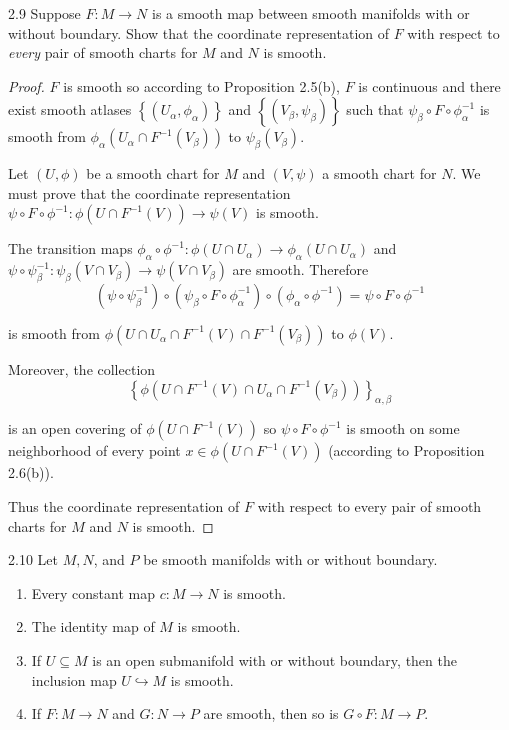\begin{exercise}{2.9}
    Suppose \( F: M \to N \) is a smooth map between smooth manifolds with or without boundary. Show that the coordinate representation of \( F \) with respect to \emph{every} pair of smooth charts for \( M \) and \( N \) is smooth.
\end{exercise}

\begin{proof}
    \( F \) is smooth so according to Proposition 2.5(b), \( F \) is continuous and there exist smooth atlases \( \left\{ (U_{\alpha}, \phi_{\alpha}) \right\} \) and \( \left\{ (V_{\beta}, \psi_{\beta}) \right\} \) such that \( \psi_{\beta} \circ F \circ \phi_{\alpha}^{-1} \) is smooth from \( \phi_{\alpha}(U_{\alpha} \cap F^{-1}(V_{\beta})) \) to \( \psi_{\beta}(V_{\beta}) \).

    Let \( (U, \phi) \) be a smooth chart for \( M \) and \( (V, \psi) \) a smooth chart for \( N \). We must prove that the coordinate representation \( \psi \circ F \circ \phi^{-1}: \phi(U \cap F^{-1}(V)) \to \psi(V) \) is smooth.

    The transition maps \( \phi_{\alpha} \circ \phi^{-1}: \phi(U \cap U_{\alpha}) \to \phi_{\alpha}(U \cap U_{\alpha}) \) and \( \psi \circ \psi_{\beta}^{-1}: \psi_{\beta}(V \cap V_{\beta}) \to \psi(V \cap V_{\beta}) \) are smooth. Therefore
    \[
        (\psi \circ \psi_{\beta}^{-1}) \circ (\psi_{\beta} \circ F \circ \phi_{\alpha}^{-1}) \circ (\phi_{\alpha} \circ \phi^{-1}) = \psi \circ F \circ \phi^{-1}
    \]

    is smooth from \( \phi(U \cap U_{\alpha} \cap F^{-1}(V) \cap F^{-1}(V_{\beta})) \) to \( \phi(V) \).

    Moreover, the collection
    \[
        {\left\{ \phi(U \cap F^{-1}(V) \cap U_{\alpha} \cap F^{-1}(V_{\beta})) \right\}}_{\alpha, \beta}
    \]

    is an open covering of \( \phi(U \cap F^{-1}(V)) \) so \( \psi \circ F \circ \phi^{-1} \) is smooth on some neighborhood of every point \( x \in \phi(U \cap F^{-1}(V)) \) (according to Proposition 2.6(b)).

    Thus the coordinate representation of \( F \) with respect to every pair of smooth charts for \( M \) and \( N \) is smooth.
\end{proof}

\begin{prop}{2.10}
    Let \( M, N \), and \( P \) be smooth manifolds with or without boundary.
    \begin{enumerate}[itemsep=0pt,label={(\alph*)}]
        \item Every constant map \( c: M \to N \) is smooth.
        \item The identity map of \( M \) is smooth.
        \item If \( U \subseteq M \) is an open submanifold with or without boundary, then the inclusion map \( U \hookrightarrow M \) is smooth.
        \item If \( F: M \to N \) and \( G: N \to P \) are smooth, then so is \( G \circ F: M \to P \).
    \end{enumerate}
\end{prop}

